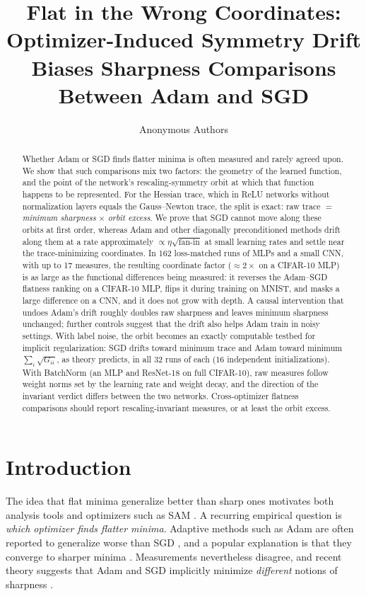 \documentclass[10pt,twocolumn]{article}
\title{\vspace{-2.2em}\textbf{Flat in the Wrong Coordinates:\\Optimizer-Induced Symmetry Drift Biases Sharpness Comparisons Between Adam and SGD}\vspace{-0.6em}}
\author{Anonymous Authors\vspace{-1.2em}}
\date{}
\theoremstyle{remark}
\begin{document}
\maketitle

\begin{abstract}
Whether Adam or SGD finds flatter minima is often measured and rarely agreed upon. We show that such comparisons mix two factors: the geometry of the learned function, and the point of the network's rescaling-symmetry orbit at which that function happens to be represented. For the Hessian trace, which in ReLU networks without normalization layers equals the Gauss--Newton trace, the split is exact: raw trace $=$ \emph{minimum sharpness} $\times$ \emph{orbit excess}. We prove that SGD cannot move along these orbits at first order, whereas Adam and other diagonally preconditioned methods drift along them at a rate approximately $\propto\eta\sqrt{\text{fan-in}}$ at small learning rates and settle near the trace-minimizing coordinates. In 162 loss-matched runs of MLPs and a small CNN, with up to 17 measures, the resulting coordinate factor ($\approx2\times$ on a CIFAR-10 MLP) is as large as the functional differences being measured: it reverses the Adam--SGD flatness ranking on a CIFAR-10 MLP, flips it during training on MNIST, and masks a large difference on a CNN, and it does not grow with depth. A causal intervention that undoes Adam's drift roughly doubles raw sharpness and leaves minimum sharpness unchanged; further controls suggest that the drift also helps Adam train in noisy settings. With label noise, the orbit becomes an exactly computable testbed for implicit regularization: SGD drifts toward minimum trace and Adam toward minimum $\sum_i\sqrt{G_{ii}}$, as theory predicts, in all 32 runs of each (16 independent initializations). With BatchNorm (an MLP and ResNet-18 on full CIFAR-10), raw measures follow weight norms set by the learning rate and weight decay, and the direction of the invariant verdict differs between the two networks. Cross-optimizer flatness comparisons should report rescaling-invariant measures, or at least the orbit excess.
\end{abstract}

\section{Introduction}
The idea that flat minima generalize better than sharp ones \citep{hochreiter1997flat,keskar2017large} motivates both analysis tools and optimizers such as SAM \citep{foret2021sam}. A recurring empirical question is \emph{which optimizer finds flatter minima}. Adaptive methods such as Adam \citep{kingma2015adam} are often reported to generalize worse than SGD \citep{wilson2017marginal}, and a popular explanation is that they converge to sharper minima \citep{zhou2020towards}. Measurements nevertheless disagree, and recent theory suggests that Adam and SGD implicitly minimize \emph{different} notions of sharpness \citep{li2025adam}.
\end{document}
